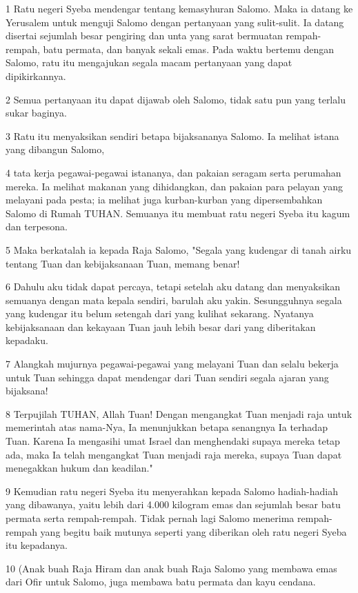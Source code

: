 \par 1 Ratu negeri Syeba mendengar tentang kemasyhuran Salomo. Maka ia datang ke Yerusalem untuk menguji Salomo dengan pertanyaan yang sulit-sulit. Ia datang disertai sejumlah besar pengiring dan unta yang sarat bermuatan rempah-rempah, batu permata, dan banyak sekali emas. Pada waktu bertemu dengan Salomo, ratu itu mengajukan segala macam pertanyaan yang dapat dipikirkannya.
\par 2 Semua pertanyaan itu dapat dijawab oleh Salomo, tidak satu pun yang terlalu sukar baginya.
\par 3 Ratu itu menyaksikan sendiri betapa bijaksananya Salomo. Ia melihat istana yang dibangun Salomo,
\par 4 tata kerja pegawai-pegawai istananya, dan pakaian seragam serta perumahan mereka. Ia melihat makanan yang dihidangkan, dan pakaian para pelayan yang melayani pada pesta; ia melihat juga kurban-kurban yang dipersembahkan Salomo di Rumah TUHAN. Semuanya itu membuat ratu negeri Syeba itu kagum dan terpesona.
\par 5 Maka berkatalah ia kepada Raja Salomo, "Segala yang kudengar di tanah airku tentang Tuan dan kebijaksanaan Tuan, memang benar!
\par 6 Dahulu aku tidak dapat percaya, tetapi setelah aku datang dan menyaksikan semuanya dengan mata kepala sendiri, barulah aku yakin. Sesungguhnya segala yang kudengar itu belum setengah dari yang kulihat sekarang. Nyatanya kebijaksanaan dan kekayaan Tuan jauh lebih besar dari yang diberitakan kepadaku.
\par 7 Alangkah mujurnya pegawai-pegawai yang melayani Tuan dan selalu bekerja untuk Tuan sehingga dapat mendengar dari Tuan sendiri segala ajaran yang bijaksana!
\par 8 Terpujilah TUHAN, Allah Tuan! Dengan mengangkat Tuan menjadi raja untuk memerintah atas nama-Nya, Ia menunjukkan betapa senangnya Ia terhadap Tuan. Karena Ia mengasihi umat Israel dan menghendaki supaya mereka tetap ada, maka Ia telah mengangkat Tuan menjadi raja mereka, supaya Tuan dapat menegakkan hukum dan keadilan."
\par 9 Kemudian ratu negeri Syeba itu menyerahkan kepada Salomo hadiah-hadiah yang dibawanya, yaitu lebih dari 4.000 kilogram emas dan sejumlah besar batu permata serta rempah-rempah. Tidak pernah lagi Salomo menerima rempah-rempah yang begitu baik mutunya seperti yang diberikan oleh ratu negeri Syeba itu kepadanya.
\par 10 (Anak buah Raja Hiram dan anak buah Raja Salomo yang membawa emas dari Ofir untuk Salomo, juga membawa batu permata dan kayu cendana.
